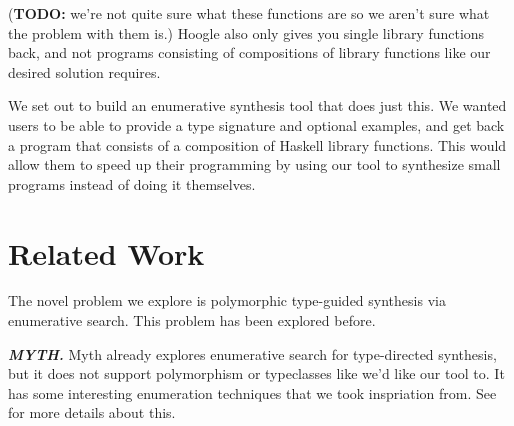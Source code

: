 \documentclass[acmsmall,nonacm]{acmart}
\begin{document}

\noindent (\textbf{TODO:} we're not quite sure what these functions are so we 
aren't sure what the problem with them is.) Hoogle also only gives you single library functions back, and not programs 
consisting of compositions of library functions like our desired solution 
requires. 

We set out to build an enumerative synthesis tool that does just this. We wanted 
users to be able 
to provide a type signature and optional examples, and get back a program 
that consists of a composition of Haskell library functions. This would allow 
them to speed up their programming by using our tool to synthesize small 
programs instead of doing it themselves. 









\section{Related Work}

The novel problem we explore is polymorphic type-guided synthesis via 
enumerative search. This problem has been explored before. 

\vspace{2mm}
\noindent \textbf{\textit{MYTH.}} Myth already explores enumerative search for 
type-directed synthesis, but it does not support polymorphism or typeclasses 
like we'd like our tool to. It has some interesting enumeration techniques that 
we took inspriation from. See  for more details about this. 
\end{document}

